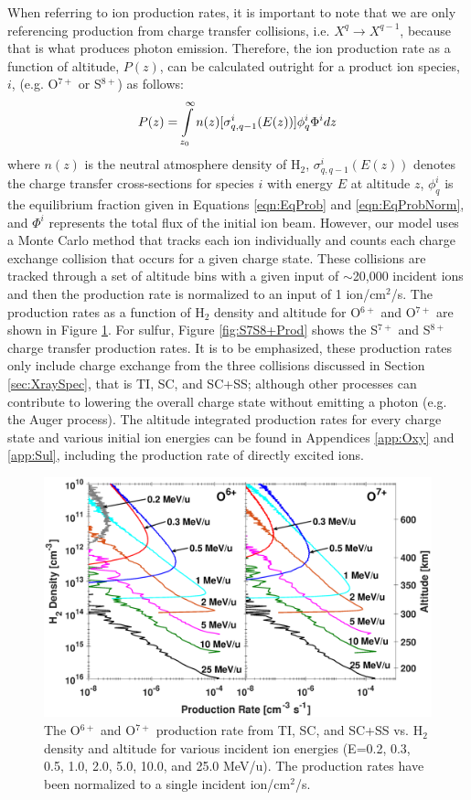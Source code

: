 \documentclass[draft]{agujournal2018}
\begin{document}
When referring to ion production rates, it is important to note that we are only referencing production from charge transfer collisions, i.e. $X^q \rightarrow X^{q-1}$, because that is what produces photon emission.
Therefore, the ion production rate as a function of altitude, $P(z)$, can be calculated outright for a product ion species, $i$, (e.g. O$^{7+}$ or S$^{8+}$) as follows:
\begin{equation}
    P(z)=\int\displaylimits_{z_0}^{\infty}n(z)[\sigma_{q,q-1}^i(E(z))]\phi_q^i\Phi^idz
\end{equation}
where $n(z)$ is the neutral atmosphere density of H$_2$, $\sigma_{q,q-1}^i(E(z))$ denotes the charge transfer cross-sections for species $i$ with energy $E$ at altitude $z$, $\phi_q^i$ is the equilibrium fraction given in Equations \ref{eqn:EqProb} and \ref{eqn:EqProbNorm}, and $\Phi^i$ represents the total flux of the initial ion beam.
However, our model uses a Monte Carlo method that tracks each ion individually and counts each charge exchange collision that occurs for a given charge state.
These collisions are tracked through a set of altitude bins with a given input of $\sim$20,000 incident ions and then the production rate is normalized to an input of 1 ion/cm$^2$/s.
The production rates as a function of H$_2$ density and altitude for O$^{6+}$ and O$^{7+}$ are shown in Figure \ref{fig:O6O7+Prod}.
For sulfur, Figure \ref{fig:S7S8+Prod} shows the S$^{7+}$ and S$^{8+}$ charge transfer production rates.
It is to be emphasized, these production rates only include charge exchange from the three collisions discussed in Section \ref{sec:XraySpec}, that is TI, SC, and SC+SS; although other processes can contribute to lowering the overall charge state without emitting a photon (e.g. the Auger process).
The altitude integrated production rates for every charge state and various initial ion energies can be found in Appendices \ref{app:Oxy} and \ref{app:Sul}, including the production rate of directly excited ions.

\begin{figure}[ht]
    \centering
    \includegraphics[width=\textwidth]{Figures/O6O7CXProd2x2.eps}
    \caption{The O$^{6+}$ and O$^{7+}$ production rate from TI, SC, and SC+SS vs. H$_2$ density and altitude for various incident ion energies (E=0.2, 0.3, 0.5, 1.0, 2.0, 5.0, 10.0, and 25.0 MeV/u). The production rates have been normalized to a single incident ion/cm$^2$/s.}
    \label{fig:O6O7+Prod}
\end{figure}
\end{document}
